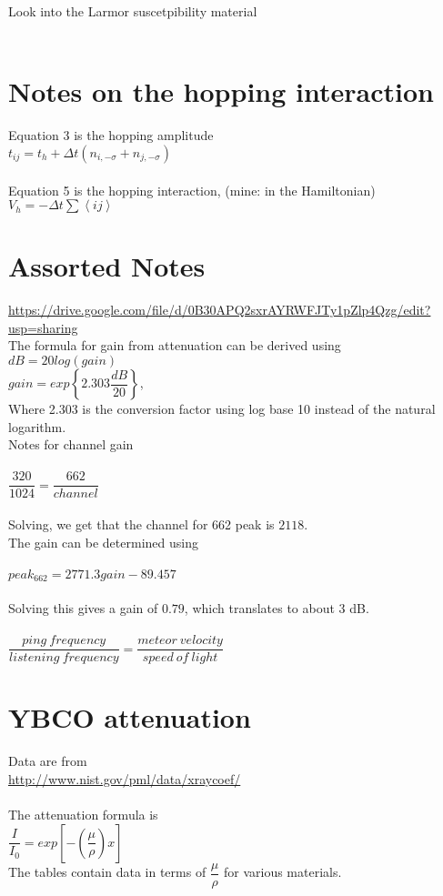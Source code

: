 \documentclass[prb,preprint]
{revtex4-1}
\begin{document}
Look into the Larmor suscetpibility material
\\
\\
\newpage
\section{Notes on the hopping interaction}
\bigskip
Equation 3 is the hopping amplitude
\\
$t_{ij} = t_h + \Delta t\left(n_{i,-\sigma} + n_{j,-\sigma}\right)$
\\\\
Equation 5 is the hopping interaction, (mine: in the Hamiltonian)
\\
$V_h = -\Delta t \sum {\left< ij \right> }$

\newpage
\section{Assorted Notes}
\bigskip
\url{https://drive.google.com/file/d/0B30APQ2sxrAYRWFJTy1pZlp4Qzg/edit?usp=sharing}
\\
The formula for gain from attenuation can be derived using
\\
$dB = 20 log\left(gain\right)$
\\
$gain = exp\left\{2.303 \dfrac{dB}{20} \right\}$, 
\\
Where 2.303 is the conversion factor using log base 10 instead of the natural logarithm.
\\
Notes for channel gain
\\
\\
$\dfrac{320}{1024} = \dfrac{662}{channel}$
\\
\\
Solving, we get that the channel for 662 peak is $2118$.
\\
The gain can be determined using
\\
\\
$peak_{662} = 2771.3 gain - 89.457$
\\
\\
Solving this gives a gain of $0.79$, which translates to about 3 dB.
\\
\\
$\dfrac{ping\ frequency}{listening\ frequency} =\dfrac{meteor\ velocity}{speed\ of\ light}$
\\
\newpage
\section{YBCO attenuation}
\bigskip
Data are from
\\
\url{http://www.nist.gov/pml/data/xraycoef/}
\\\\
The attenuation formula is
\\
$\dfrac{I}{I_0} = exp\left[ -\left(\dfrac{\mu}{\rho}\right)x\right]$
\\
The tables contain data in terms of $\dfrac{\mu}{\rho}$ for various materials.
\end{document}
